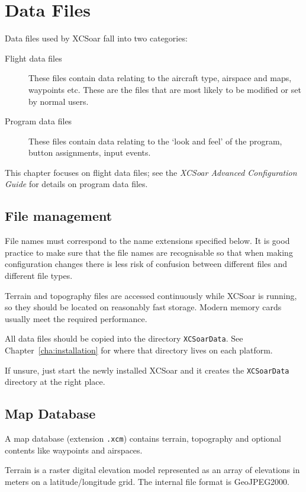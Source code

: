 \chapter{Data Files}\label{cha:data-files}

Data files used by XCSoar fall into two categories:
\begin{description}
\item[Flight data files]  These files contain data relating to
the aircraft type, airspace and maps, waypoints etc.  These are the
files that are most likely to be modified or set by normal users.
\item[Program data files]  These files contain data relating to
the `look and feel' of the program,
button assignments, input events.
\end{description}
This chapter focuses on flight data files; see the {\em XCSoar
Advanced Configuration Guide} for details on program data files.

\section{File management}

File names must correspond to the name extensions specified below.  It
is good practice to make sure that the file names are recognisable so
that when making configuration changes there is less risk of confusion
between different files and different file types.

Terrain and topography files are accessed continuously while XCSoar is
running, so they should be located on reasonably fast storage.
Modern memory cards usually meet the required performance.

All data files should be copied into the directory
\verb|XCSoarData|.  See Chapter~\ref{cha:installation} for where that
directory lives on each platform.

If unsure, just start the newly installed XCSoar and it creates the \verb|XCSoarData|
directory at the right place.

\section{Map Database}\label{sec:map}

A map database (extension \verb|.xcm|) contains terrain,
topography and optional contents like waypoints and airspaces.

Terrain is a raster digital elevation model represented as an array of
elevations in meters on a latitude/longitude grid.  The internal file
format is GeoJPEG2000.

